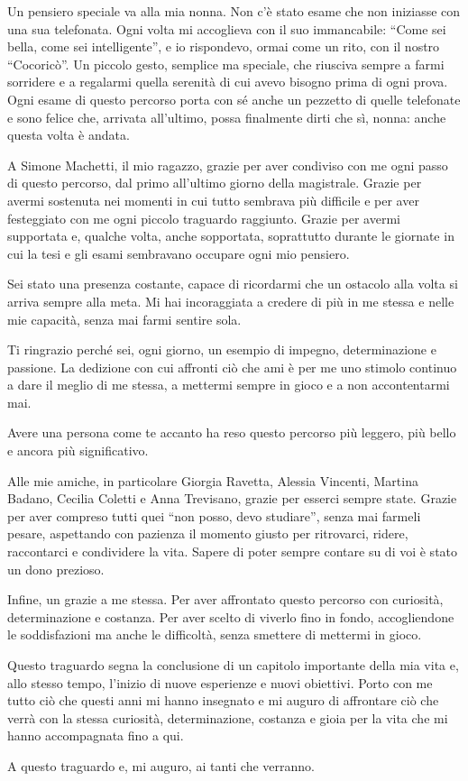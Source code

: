 Un pensiero speciale va alla mia nonna. Non c'è stato esame che non iniziasse con una sua telefonata. Ogni volta mi accoglieva con il suo immancabile: ``Come sei bella, come sei intelligente'', e io rispondevo, ormai come un rito, con il nostro ``Cocoricò''. Un piccolo gesto, semplice ma speciale, che riusciva sempre a farmi sorridere e a regalarmi quella serenità di cui avevo bisogno prima di ogni prova. Ogni esame di questo percorso porta con sé anche un pezzetto di quelle telefonate e sono felice che, arrivata all'ultimo, possa finalmente dirti che sì, nonna: anche questa volta è andata.

A Simone Machetti, il mio ragazzo, grazie per aver condiviso con me ogni passo di questo percorso, dal primo all'ultimo giorno della magistrale. Grazie per avermi sostenuta nei momenti in cui tutto sembrava più difficile e per aver festeggiato con me ogni piccolo traguardo raggiunto. Grazie per avermi supportata e, qualche volta, anche sopportata, soprattutto durante le giornate in cui la tesi e gli esami sembravano occupare ogni mio pensiero.

Sei stato una presenza costante, capace di ricordarmi che un ostacolo alla volta si arriva sempre alla meta. Mi hai incoraggiata a credere di più in me stessa e nelle mie capacità, senza mai farmi sentire sola.

Ti ringrazio perché sei, ogni giorno, un esempio di impegno, determinazione e passione. La dedizione con cui affronti ciò che ami è per me uno stimolo continuo a dare il meglio di me stessa, a mettermi sempre in gioco e a non accontentarmi mai.

Avere una persona come te accanto ha reso questo percorso più leggero, più bello e ancora più significativo.

Alle mie amiche, in particolare Giorgia Ravetta, Alessia Vincenti, Martina Badano, Cecilia Coletti e Anna Trevisano, grazie per esserci sempre state. Grazie per aver compreso tutti quei ``non posso, devo studiare'', senza mai farmeli pesare, aspettando con pazienza il momento giusto per ritrovarci, ridere, raccontarci e condividere la vita. Sapere di poter sempre contare su di voi è stato un dono prezioso.

Infine, un grazie a me stessa. Per aver affrontato questo percorso con curiosità, determinazione e costanza. Per aver scelto di viverlo fino in fondo, accogliendone le soddisfazioni ma anche le difficoltà, senza smettere di mettermi in gioco.

Questo traguardo segna la conclusione di un capitolo importante della mia vita e, allo stesso tempo, l'inizio di nuove esperienze e nuovi obiettivi. Porto con me tutto ciò che questi anni mi hanno insegnato e mi auguro di affrontare ciò che verrà con la stessa curiosità, determinazione, costanza e gioia per la vita che mi hanno accompagnata fino a qui.

A questo traguardo e, mi auguro, ai tanti che verranno.

\setlength{\parskip}{0em}

\vspace{1.5cm}

\hfill \Candidato
